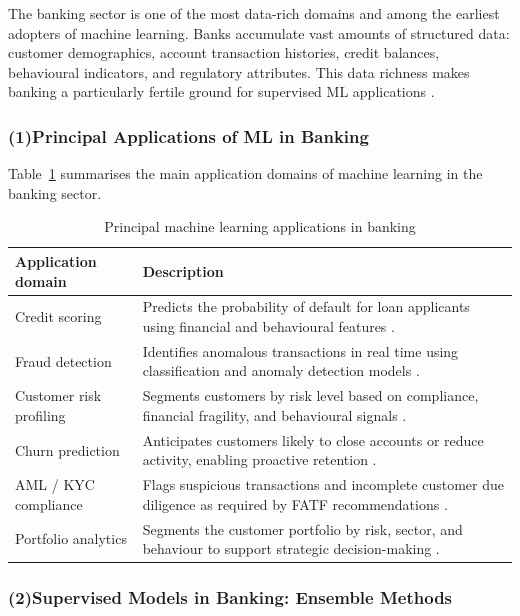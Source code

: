 The banking sector is one of the most data-rich domains and among the earliest adopters of
machine learning. Banks accumulate vast amounts of structured data: customer demographics,
account transaction histories, credit balances, behavioural indicators, and regulatory
attributes. This data richness makes banking a particularly fertile ground for supervised ML
applications \cite{hand1997}.

\subsubsection{(1)Principal Applications of ML in Banking}

Table~\ref{tab:ml_banking_applications} summarises the main application domains of machine
learning in the banking sector.

\begin{table}[H]
\centering
\small
\caption{Principal machine learning applications in banking}
\label{tab:ml_banking_applications}
\begin{tabular}{|p{4cm}|p{8cm}|}
\hline
\rowcolor{blue!15}
\textbf{Application domain} & \textbf{Description} \\
\hline
Credit scoring & Predicts the probability of default for loan applicants using financial
and behavioural features \cite{hand1997, lessmann2015}. \\
\hline
Fraud detection & Identifies anomalous transactions in real time using classification and
anomaly detection models \cite{breiman2001}. \\
\hline
Customer risk profiling & Segments customers by risk level based on compliance, financial
fragility, and behavioural signals \cite{baesens2003}. \\
\hline
Churn prediction & Anticipates customers likely to close accounts or reduce activity,
enabling proactive retention \cite{hastie2009}. \\
\hline
AML / KYC compliance & Flags suspicious transactions and incomplete customer due diligence
as required by FATF recommendations \cite{fatf2012}. \\
\hline
Portfolio analytics & Segments the customer portfolio by risk, sector, and behaviour to
support strategic decision-making \cite{bcbs2011}. \\
\hline
\end{tabular}
\end{table}

\subsubsection{(2)Supervised Models in Banking: Ensemble Methods}

